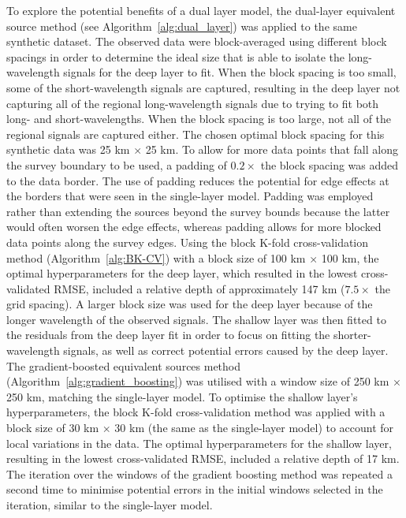 To explore the potential benefits of a dual layer model, the dual-layer equivalent source method (see Algorithm~\ref{alg:dual_layer}) was applied to the same synthetic dataset. The observed data were block-averaged using different block spacings in order to determine the ideal size that is able to isolate the long-wavelength signals for the deep layer to fit. When the block spacing is too small, some of the short-wavelength signals are captured, resulting in the deep layer not capturing all of the regional long-wavelength signals due to trying to fit both long- and short-wavelengths. When the block spacing is too large, not all of the regional signals are captured either. The chosen optimal block spacing for this synthetic data was 25 km $\times$ 25 km. To allow for more data points that fall along the survey boundary to be used, a padding of $0.2 \times $ the block spacing was added to the data border. The use of padding reduces the potential for edge effects at the borders that were seen in the single-layer model. Padding was employed rather than extending the sources beyond the survey bounds because the latter would often worsen the edge effects, whereas padding allows for more blocked data points along the survey edges. Using the block K-fold cross-validation method (Algorithm~\ref{alg:BK-CV}) with a block size of 100 km $\times$ 100 km, the optimal hyperparameters for the deep layer, which resulted in the lowest cross-validated RMSE, included a relative depth of approximately 147 km ($7.5 \times$ the grid spacing). A larger block size was used for the deep layer because of the longer wavelength of the observed signals. The shallow layer was then fitted to the residuals from the deep layer fit in order to focus on fitting the shorter-wavelength signals, as well as correct potential errors caused by the deep layer. The gradient-boosted equivalent sources method (Algorithm~\ref{alg:gradient_boosting}) was utilised with a window size of 250 km $\times$ 250 km, matching the single-layer model. To optimise the shallow layer’s hyperparameters, the block K-fold cross-validation method was applied with a block size of 30 km $\times$ 30 km (the same as the single-layer model) to account for local variations in the data. The optimal hyperparameters for the shallow layer, resulting in the lowest cross-validated RMSE, included a relative depth of 17 km. The iteration over the windows of the gradient boosting method was repeated a second time to minimise potential errors in the initial windows selected in the iteration, similar to the single-layer model.

